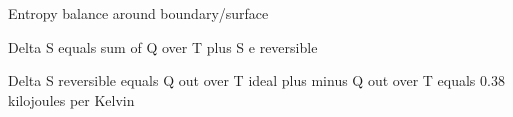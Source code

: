 Entropy balance around boundary/surface

Delta S equals sum of Q over T plus S e reversible

Delta S reversible equals Q out over T ideal plus minus Q out over T equals 0.38 kilojoules per Kelvin
